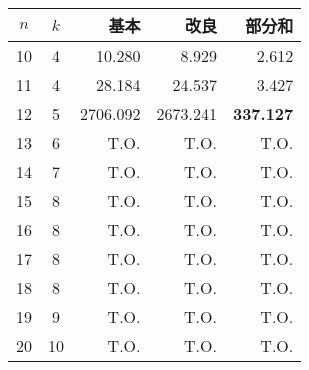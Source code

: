  \centering 
 \begin{tabular}{c|c|r|r|r} \hline
  $n$ & $k$ & 基本 & 改良 & 部分和 \\ \hline
  10 & 4 & 10.280 & 8.929 & 2.612 \\
  11 & 4 & 28.184 & 24.537 & 3.427 \\
  12 & 5 & 2706.092 & 2673.241 & \textbf{337.127} \\
  13 & 6 & T.O. & T.O. & T.O. \\  
  14 & 7 & T.O. & T.O. & T.O. \\   
  15 & 8 & T.O. & T.O. & T.O. \\  
  16 & 8 & T.O. & T.O. & T.O. \\
  17 & 8 & T.O. & T.O. & T.O. \\
  18 & 8 & T.O. & T.O. & T.O. \\
  19 & 9 & T.O. & T.O. & T.O. \\
  20 & 10 & T.O. & T.O. & T.O. \\ \hline
 \end{tabular}